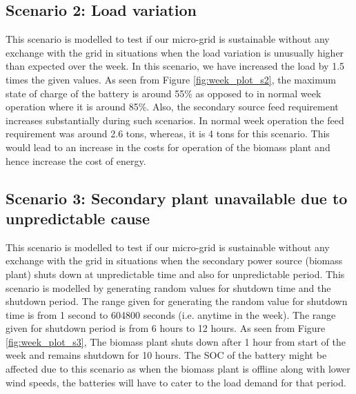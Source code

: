 \subsection{Scenario 2: Load variation}
This scenario is modelled to test if our micro-grid is sustainable without any exchange with the grid in situations when the load variation is unusually higher than expected over the week. In this scenario, we have increased the load by 1.5 times the given values. As seen from Figure \ref{fig:week_plot_s2}, the maximum state of charge of the battery is around 55\% as opposed to in normal week operation where it is around 85\%. Also, the secondary source feed requirement increases substantially during such scenarios. In normal week operation the feed requirement was around 2.6 tons, whereas, it is 4 tons for this scenario. This would lead to an increase in the costs for operation of the biomass plant and hence increase the cost of energy.

\subsection{Scenario 3: Secondary plant unavailable due to unpredictable cause}
This scenario is modelled to test if our micro-grid is sustainable without any exchange with the grid in situations when the secondary power source (biomass plant) shuts down at unpredictable time and also for unpredictable period. This scenario is modelled by generating random values for shutdown time and the shutdown period. The range given for generating the random value for shutdown time is from 1 second to 604800 seconds (i.e. anytime in the week). The range given for shutdown period is from 6 hours to 12 hours. As seen from Figure \ref{fig:week_plot_s3}, The biomass plant shuts down after 1 hour from start of the week and remains shutdown for 10 hours. The SOC of the battery might be affected due to this scenario as when the biomass plant is offline along with lower wind speeds, the batteries will have to cater to the load demand for that period.




\vspace{15mm}


